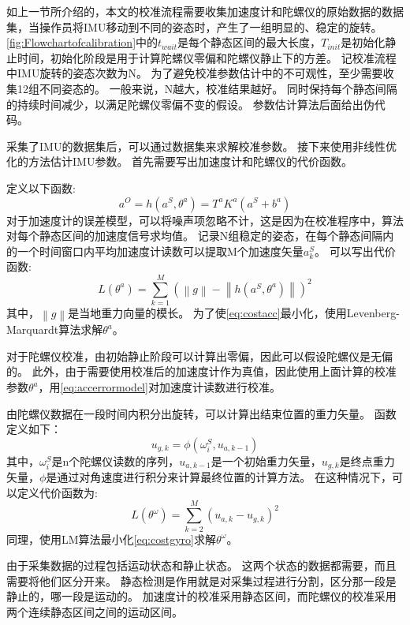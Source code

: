 \documentclass[
  type=master
]{gdutthesis}
\begin{document}
如上一节所介绍的，本文的校准流程需要收集加速度计和陀螺仪的原始数据的数据集，当操作员将IMU移动到不同的姿态时，产生了一组明显的、稳定的旋转。
\autoref{fig:Flowchartofcalibration}中的$t_{wait}$是每个静态区间的最大长度，$T_{init}$是初始化静止时间，初始化阶段是用于计算陀螺仪零偏和陀螺仪静止下的方差。
记校准流程中IMU旋转的姿态次数为N。
为了避免校准参数估计中的不可观性，至少需要收集12组不同姿态的。
一般来说，N越大，校准结果越好。
同时保持每个静态间隔的持续时间减少，以满足陀螺仪零偏不变的假设。
参数估计算法后面给出伪代码。

采集了IMU的数据集后，可以通过数据集来求解校准参数。
接下来使用非线性优化的方法估计IMU参数。
首先需要写出加速度计和陀螺仪的代价函数。

定义以下函数:
\begin{equation}
	a^O=h(a^S,\theta^a) =T^a K^a (a^S + b^a)
\end{equation}
对于加速度计的误差模型，可以将噪声项忽略不计，这是因为在校准程序中，算法对每个静态区间的加速度信号求均值。
记录N组稳定的姿态，在每个静态间隔内的一个时间窗口内平均加速度计读数可以提取M个加速度矢量$a^S_k$。
可以写出代价函数:
\begin{equation}\label{eq:costacc}
	L(\theta^a)=\sum_{k=1}^{M}(\left\|g\right\|-\left\|h(a^S,\theta^a)\right\|)^2
\end{equation}
其中，$\left\|g\right\|$是当地重力向量的模长。
为了使\autoref{eq:costacc}最小化，使用Levenberg-Marquardt算法求解$\theta^a$。

对于陀螺仪校准，由初始静止阶段可以计算出零偏，因此可以假设陀螺仪是无偏的。
此外，由于需要使用校准后的加速度计作为真值，因此使用上面计算的校准参数$\theta^a$，用\autoref{eq:accerrormodel}对加速度计读数进行校准。

由陀螺仪数据在一段时间内积分出旋转，可以计算出结束位置的重力矢量。
函数定义如下：
\begin{equation}\label{eq:integration}
	u_{g,k}=\phi(\omega^S_i , u_{a,k-1})
\end{equation}
其中，$\omega^S_i$是n个陀螺仪读数的序列，$u_{a,k-1}$是一个初始重力矢量，$u_{g,k}$是终点重力矢量，$\phi$是通过对角速度进行积分来计算最终位置的计算方法。
在这种情况下，可以定义代价函数为:
\begin{equation}\label{eq:costgyro}
	L(\theta^\omega)=\sum_{k=2}^{M}(u_{a,k}-u_{g,k})^2
\end{equation}
同理，使用LM算法最小化\autoref{eq:costgyro}求解$\theta^\omega$。

由于采集数据的过程包括运动状态和静止状态。
这两个状态的数据都需要，而且需要将他们区分开来。
静态检测是作用就是对采集过程进行分割，区分那一段是静止的，哪一段是运动的。
加速度计的校准采用静态区间，而陀螺仪的校准采用两个连续静态区间之间的运动区间。
\end{document}
